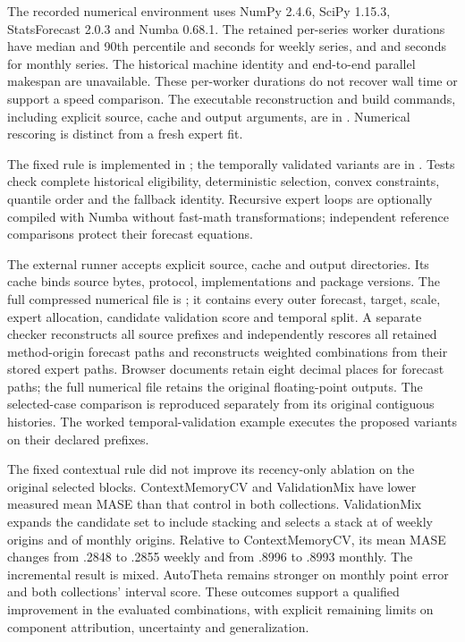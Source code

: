 \documentclass[11pt,a4paper]{article}
\begin{document}
The recorded numerical environment uses NumPy 2.4.6, SciPy 1.15.3, StatsForecast 2.0.3 and Numba 0.68.1. The retained per-series worker durations have median and 90th percentile \weeklyMedianSeconds{} and \weeklyPninetySeconds{} seconds for weekly series, and \monthlyMedianSeconds{} and \monthlyPninetySeconds{} seconds for monthly series. The historical machine identity and end-to-end parallel makespan are unavailable. These per-worker durations do not recover wall time or support a speed comparison. The executable reconstruction and build commands, including explicit source, cache and output arguments, are in . Numerical rescoring is distinct from a fresh expert fit.

The fixed rule is implemented in ; the temporally validated variants are in . Tests check complete historical eligibility, deterministic selection, convex constraints, quantile order and the fallback identity. Recursive expert loops are optionally compiled with Numba without fast-math transformations; independent reference comparisons protect their forecast equations.

The external runner accepts explicit source, cache and output directories. Its cache binds source bytes, protocol, implementations and package versions. The full compressed numerical file is ; it contains every outer forecast, target, scale, expert allocation, candidate validation score and temporal split. A separate checker reconstructs all source prefixes and independently rescores all \externalpathcount{} retained method-origin forecast paths and reconstructs weighted combinations from their stored expert paths. Browser documents retain eight decimal places for forecast paths; the full numerical file retains the original floating-point outputs. The selected-case comparison is reproduced separately from its original contiguous histories. The worked temporal-validation example executes the proposed variants on their declared prefixes.

The fixed contextual rule did not improve its recency-only ablation on the original selected blocks. ContextMemoryCV and ValidationMix have lower measured mean MASE than that control in both collections. ValidationMix expands the candidate set to include stacking and selects a stack at \weeklyStackOrigins{} of \weeklyAllOrigins{} weekly origins and \monthlyStackOrigins{} of \monthlyAllOrigins{} monthly origins. Relative to ContextMemoryCV, its mean MASE changes from .2848 to .2855 weekly and from .8996 to .8993 monthly. The incremental result is mixed. AutoTheta remains stronger on monthly point error and both collections' interval score. These outcomes support a qualified improvement in the evaluated combinations, with explicit remaining limits on component attribution, uncertainty and generalization.
\end{document}
